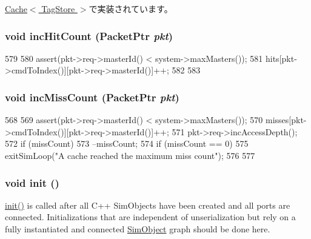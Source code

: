 \hyperlink{classCache_a2a9a72a19c7910262542bc96de2488fb}{Cache$<$ TagStore $>$}で実装されています。\hypertarget{classBaseCache_a5d0c42b459c95506252f8916dc4abc9c}{
\subsubsection[{incHitCount}]{\setlength{\rightskip}{0pt plus 5cm}void incHitCount ({\bf PacketPtr} {\em pkt})}}
\label{classBaseCache_a5d0c42b459c95506252f8916dc4abc9c}



\begin{DoxyCode}
579     {
580         assert(pkt->req->masterId() < system->maxMasters());
581         hits[pkt->cmdToIndex()][pkt->req->masterId()]++;
582 
583     }
\end{DoxyCode}
\hypertarget{classBaseCache_a998427ec80c26469aae228b0d6bd9bd0}{
\subsubsection[{incMissCount}]{\setlength{\rightskip}{0pt plus 5cm}void incMissCount ({\bf PacketPtr} {\em pkt})}}
\label{classBaseCache_a998427ec80c26469aae228b0d6bd9bd0}



\begin{DoxyCode}
568     {
569         assert(pkt->req->masterId() < system->maxMasters());
570         misses[pkt->cmdToIndex()][pkt->req->masterId()]++;
571         pkt->req->incAccessDepth();
572         if (missCount) {
573             --missCount;
574             if (missCount == 0)
575                 exitSimLoop("A cache reached the maximum miss count");
576         }
577     }
\end{DoxyCode}
\hypertarget{classBaseCache_a02fd73d861ef2e4aabb38c0c9ff82947}{
\subsubsection[{init}]{\setlength{\rightskip}{0pt plus 5cm}void init ()}}
\label{classBaseCache_a02fd73d861ef2e4aabb38c0c9ff82947}
\hyperlink{classBaseCache_a02fd73d861ef2e4aabb38c0c9ff82947}{init()} is called after all C++ SimObjects have been created and all ports are connected. Initializations that are independent of unserialization but rely on a fully instantiated and connected \hyperlink{classSimObject}{SimObject} graph should be done here. 

